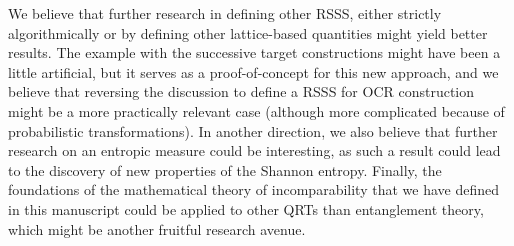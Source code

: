 We believe that further research in defining other RSSS, either strictly algorithmically or by defining other lattice-based quantities might yield better results. The example with the successive target constructions might have been a little artificial, but it serves as a proof-of-concept for this new approach, and we believe that reversing the discussion to define a RSSS for OCR construction might be a more practically relevant case (although more complicated because of probabilistic transformations). In another direction, we also believe that further research on an entropic measure could be interesting, as such a result could lead to the discovery of new properties of the Shannon entropy. Finally, the foundations of the mathematical theory of incomparability that we have defined in this manuscript could be applied to other QRTs than entanglement theory, which might be another fruitful research avenue.